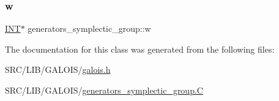 \mbox{\label{classgenerators__symplectic__group_ac26455c8d745b051249f188096fba9bb}} 
\subsubsection{\texorpdfstring{w}{w}}
{\footnotesize\ttfamily \mbox{\hyperlink{galois_8h_a09fddde158a3a20bd2dcadb609de11dc}{I\+NT}}$\ast$ generators\+\_\+symplectic\+\_\+group\+::w}



The documentation for this class was generated from the following files\+:\begin{DoxyCompactItemize}
\item 
S\+R\+C/\+L\+I\+B/\+G\+A\+L\+O\+I\+S/\mbox{\hyperlink{galois_8h}{galois.\+h}}\item 
S\+R\+C/\+L\+I\+B/\+G\+A\+L\+O\+I\+S/\mbox{\hyperlink{generators__symplectic__group_8_c}{generators\+\_\+symplectic\+\_\+group.\+C}}\end{DoxyCompactItemize}
